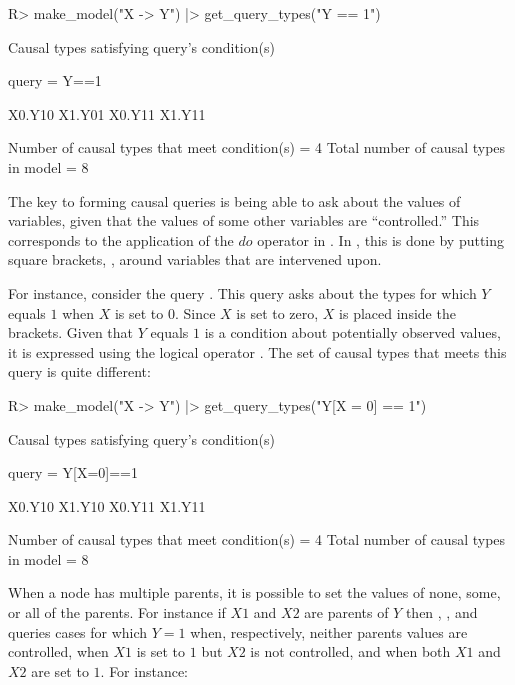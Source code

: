 \documentclass[
  11pt,
  article]{jss}
\renewcommand{\texttt}[1]{\code{#1}}
\begin{document}
\begin{CodeChunk}
\begin{CodeInput}
R> make_model("X -> Y")  |> get_query_types("Y == 1")
\end{CodeInput}

\begin{CodeOutput}

Causal types satisfying query's condition(s)  

 query =  Y==1 

X0.Y10  X1.Y01
X0.Y11  X1.Y11


 Number of causal types that meet condition(s) =  4
 Total number of causal types in model =  8
\end{CodeOutput}
\end{CodeChunk}

The key to forming causal queries is being able to ask about the values
of variables, given that the values of some other variables are
``controlled.'' This corresponds to the application of the \(do\)
operator in \citet{pearl_causality_2009}. In , this
is done by putting square brackets, \texttt{{[}\ {]}}, around variables
that are intervened upon.

For instance, consider the query \texttt{Y{[}X\ =\ 0{]}\ ==\ 1}. This
query asks about the types for which \(Y\) equals \(1\) when \(X\) is
set to \(0\). Since \(X\) is set to zero, \(X\) is placed inside the
brackets. Given that \(Y\) equals \(1\) is a condition about potentially
observed values, it is expressed using the logical operator \texttt{==}.
The set of causal types that meets this query is quite different:

\begin{CodeChunk}
\begin{CodeInput}
R> make_model("X -> Y") |> get_query_types("Y[X = 0] == 1")
\end{CodeInput}

\begin{CodeOutput}

Causal types satisfying query's condition(s)  

 query =  Y[X=0]==1 

X0.Y10  X1.Y10
X0.Y11  X1.Y11


 Number of causal types that meet condition(s) =  4
 Total number of causal types in model =  8
\end{CodeOutput}
\end{CodeChunk}

When a node has multiple parents, it is possible to set the values of
none, some, or all of the parents. For instance if \(X1\) and \(X2\) are
parents of \(Y\) then \texttt{Y\ ==\ 1},
\texttt{Y{[}X1\ =\ 1{]}\ ==\ 1}, and
\texttt{Y{[}X1\ =\ 1,\ X2\ =\ 1{]}\ ==\ 1} queries cases for which
\(Y=1\) when, respectively, neither parents values are controlled, when
\(X1\) is set to \(1\) but \(X2\) is not controlled, and when both
\(X1\) and \(X2\) are set to \(1\). For instance:
\end{document}
